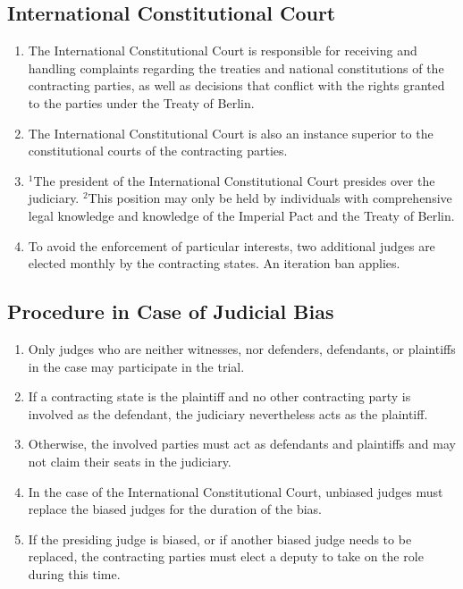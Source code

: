 \documentclass{article}
\begin{document}
\subsection{International Constitutional Court}
\begin{enumerate}[(1)]
    \item The International Constitutional Court is responsible for receiving and handling complaints regarding the treaties and national constitutions of the contracting parties, as well as decisions that conflict with the rights granted to the parties under the Treaty of Berlin.
    \item The International Constitutional Court is also an instance superior to the constitutional courts of the contracting parties.
    \item ${^1}$The president of the International Constitutional Court presides over the judiciary. ${^2}$This position may only be held by individuals with comprehensive legal knowledge and knowledge of the Imperial Pact and the Treaty of Berlin.
    \item To avoid the enforcement of particular interests, two additional judges are elected monthly by the contracting states. An iteration ban applies.
\end{enumerate}

\subsection{Procedure in Case of Judicial Bias}
\begin{enumerate}[(1)]
    \item Only judges who are neither witnesses, nor defenders, defendants, or plaintiffs in the case may participate in the trial.
    \item If a contracting state is the plaintiff and no other contracting party is involved as the defendant, the judiciary nevertheless acts as the plaintiff.
    \item Otherwise, the involved parties must act as defendants and plaintiffs and may not claim their seats in the judiciary.
    \item In the case of the International Constitutional Court, unbiased judges must replace the biased judges for the duration of the bias.
    \item If the presiding judge is biased, or if another biased judge needs to be replaced, the contracting parties must elect a deputy to take on the role during this time.
\end{enumerate}
\end{document}
